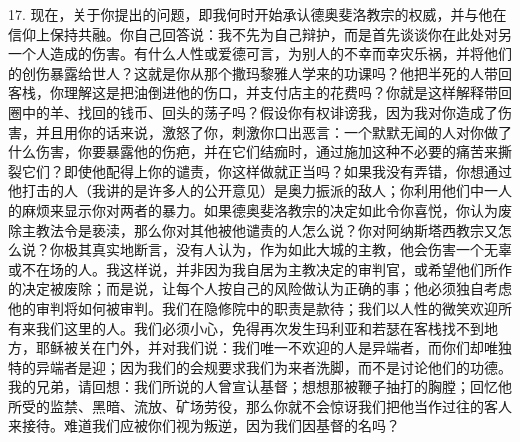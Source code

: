 17. 现在，关于你提出的问题，即我何时开始承认德奥斐洛教宗的权威，并与他在信仰上保持共融。你自己回答说：我不先为自己辩护，而是首先谈谈你在此处对另一个人造成的伤害。有什么人性或爱德可言，为别人的不幸而幸灾乐祸，并将他们的创伤暴露给世人？这就是你从那个撒玛黎雅人学来的功课吗？他把半死的人带回客栈，你理解这是把油倒进他的伤口，并支付店主的花费吗？你就是这样解释带回圈中的羊、找回的钱币、回头的荡子吗？假设你有权诽谤我，因为我对你造成了伤害，并且用你的话来说，激怒了你，刺激你口出恶言：一个默默无闻的人对你做了什么伤害，你要暴露他的伤疤，并在它们结痂时，通过施加这种不必要的痛苦来撕裂它们？即使他配得上你的谴责，你这样做就正当吗？如果我没有弄错，你想通过他打击的人（我讲的是许多人的公开意见）是奥力振派的敌人；你利用他们中一人的麻烦来显示你对两者的暴力。如果德奥斐洛教宗的决定如此令你喜悦，你认为废除主教法令是亵渎，那么你对其他被他谴责的人怎么说？你对阿纳斯塔西教宗又怎么说？你极其真实地断言，没有人认为，作为如此大城的主教，他会伤害一个无辜或不在场的人。我这样说，并非因为我自居为主教决定的审判官，或希望他们所作的决定被废除；而是说，让每个人按自己的风险做认为正确的事；他必须独自考虑他的审判将如何被审判。我们在隐修院中的职责是款待；我们以人性的微笑欢迎所有来我们这里的人。我们必须小心，免得再次发生玛利亚和若瑟在客栈找不到地方，耶稣被关在门外，并对我们说：我们唯一不欢迎的人是异端者，而你们却唯独特的异端者是迎；因为我们的会规要求我们为来者洗脚，而不是讨论他们的功德。我的兄弟，请回想：我们所说的人曾宣认基督；想想那被鞭子抽打的胸膛；回忆他所受的监禁、黑暗、流放、矿场劳役，那么你就不会惊讶我们把他当作过往的客人来接待。难道我们应被你们视为叛逆，因为我们因基督的名吗？\par

